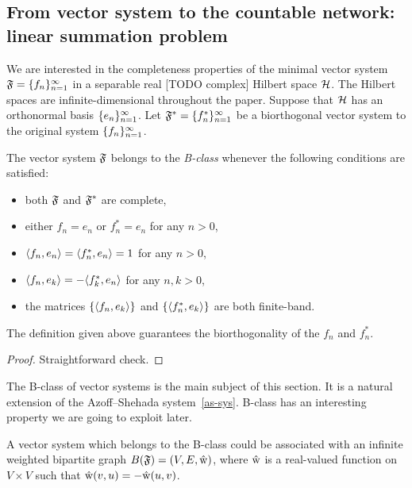 \documentclass[12pt]{article}
\begin{document}
  \subsection{From vector system to the countable network: linear summation problem}
    \label{fsys2graphs}
    We are interested in the completeness properties of the minimal vector system $\fsys = \seq{f}$
      in a separable real [TODO complex] Hilbert space $\cal{H}$.
    The Hilbert spaces are infinite-dimensional throughout the paper.
    Suppose that $\cal{H}$ has an orthonormal basis $\seq{e}$.
    Let $\fstarsys = \{f_n^{*}\}_{n=1}^\infty$ be a biorthogonal vector system to the original system $\seq{f}$.
    \begin{definition}
        The vector system $\fsys$ belongs to the \emph{B-class} whenever the following conditions are satisfied:
        \begin{itemize}
            \item both $\fsys$ and $\fstarsys$ are complete,
            \item either $f_n = e_n$ or $f^*_n = e_n$ for any $n > 0$,
            \item $\inner{f_n}{e_n} = \inner{f^*_n}{e_n} = 1$ for any $n > 0$,
            \item $\inner{f_n}{e_k} = -\inner{f^*_k}{e_n}$ for any $n, k > 0$,
            \item the matrices $\{\inner{f_n}{e_k}\}$ and $\{\inner{f^*_n}{e_k}\}$ are both finite-band.
        \end{itemize}
    \end{definition}
    \begin{prop}
      The definition given above guarantees the biorthogonality of the $f_n$ and $f^*_n$.
    \end{prop}
    \begin{proof}
      Straightforward check.
    \end{proof}
    The B-class of vector systems is the main subject of this section.
    It is a natural extension of the Azoff--Shehada system~\eqref{as-sys}.
    B-class has an interesting property we are going to exploit later.
    \begin{prop}
      A vector system which belongs to the B-class could be associated with an
        infinite weighted bipartite graph $B(\fsys) = (V, E, \wt)$, where $\wt$ is a
        real-valued function on $V\times V$ such that $\wt(v, u) = -\wt(u, v)$.
    \end{prop}
\end{document}
